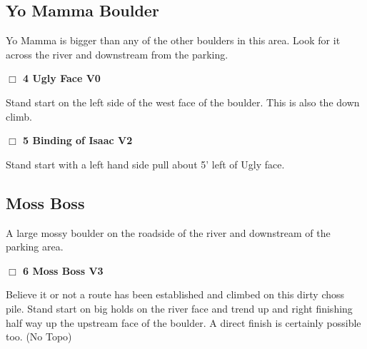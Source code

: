 \begin{multicols}{2}
\needspace{10em}
\subsection*{Yo Mamma Boulder}\label{bf:Yo Mamma Boulder}

Yo Mamma is bigger than any of the other boulders in this area. Look for it across the river and downstream from the parking.\\



\needspace{2em}
\label{rt:Ugly Face}
\colorbox{green!20}{
\parbox{0.95\linewidth}{
\hspace{-1ex}\textbf{$\Box$
4 Ugly Face V0  \warn
}}}
\begin{adjustwidth}{1.3em}{}			

Stand start on the left side of the west face of the boulder. This is also the down climb.
\end{adjustwidth}




\needspace{2em}
\label{rt:Binding of Isaac}
\colorbox{green!20}{
\parbox{0.95\linewidth}{
\hspace{-1ex}\textbf{$\Box$
5 Binding of Isaac V2  \warn
}}}
\begin{adjustwidth}{1.3em}{}			

Stand start with a left hand side pull about 5' left of Ugly face.
\end{adjustwidth}





\needspace{10em}
\subsection*{Moss Boss}\label{bf:Moss Boss}

A large mossy boulder on the roadside of the river and downstream of the parking area.\\



\needspace{2em}
\label{rt:Moss Boss}
\colorbox{green!20}{
\parbox{0.95\linewidth}{
\hspace{-1ex}\textbf{$\Box$
6 Moss Boss V3  
}}}
\begin{adjustwidth}{1.3em}{}			

Believe it or not a route has been established and climbed on this dirty choss pile. Stand start on big holds on the river face and trend up and right finishing half way up the upstream face of the boulder. A direct finish is certainly possible too.
  (No Topo)
\end{adjustwidth}




	\end{multicols}
